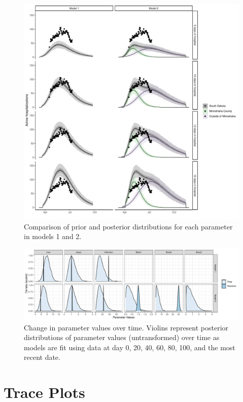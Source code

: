 \documentclass[
]{article}
\begin{document}
\begin{figure}
\centering
\includegraphics{manuscript_files/figure-latex/unnamed-chunk-5-1.pdf}
\caption{\label{fig:unnamed-chunk-5}Comparison of prior and posterior distributions for each parameter in models 1 and 2.}
\end{figure}

\begin{figure}
\centering
\includegraphics{manuscript_files/figure-latex/unnamed-chunk-6-1.pdf}
\caption{\label{fig:unnamed-chunk-6}Change in parameter values over time. Violins represent posterior distributions of parameter values (untransformed) over time as models are fit using data at day 0, 20, 40, 60, 80, 100, and the most recent date.\label{param_time_plot:plot}}
\end{figure}

\hypertarget{trace-plots}{%
\section{Trace Plots}\label{trace-plots}}
\end{document}
